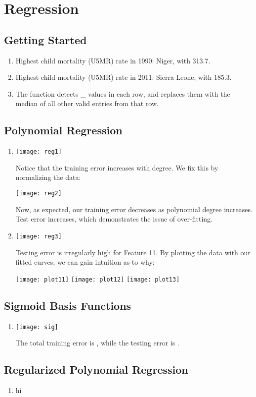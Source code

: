 \documentclass{article}
\begin{document}
\section{Regression}
\subsection{Getting Started}

\begin{enumerate}
\item Highest child mortality (U5MR) rate in 1990: Niger, with 313.7.
\item Highest child mortality (U5MR) rate in 2011: Sierra Leone, with 185.3.
\item The function detects \_ values in each row, and replaces
  them with the median of all other valid entries from that row.
\end{enumerate}

\subsection{Polynomial Regression}

\begin{enumerate}
\item \begin{center}
  \texttt{[image: reg1]}
\end{center}
  Notice that the training error increases with degree. We fix this
  by normalizing the data:
  \begin{center}
      \texttt{[image: reg2]}
  \end{center}
  Now, as expected, our training error decreases as polynomial degree
  increases. Test error increases, which demonstrates the issue
  of over-fitting.
\item \begin{center}
  \texttt{[image: reg3]}
\end{center}
  Testing error is irregularly high for Feature 11. By plotting
  the data with our fitted curves, we can gain intuition as to why:
  \begin{center}
    \texttt{[image: plot11]}
    \texttt{[image: plot12]}
    \texttt{[image: plot13]}
  \end{center}
\end{enumerate}

\subsection{Sigmoid Basis Functions}

\begin{enumerate}
\item \begin{center}
  \texttt{[image: sig]}
\end{center}
  The total training error is , while the testing error is
  .
\end{enumerate}

\subsection{Regularized Polynomial Regression}

\begin{enumerate}
  \item hi
\end{enumerate}
\end{document}
